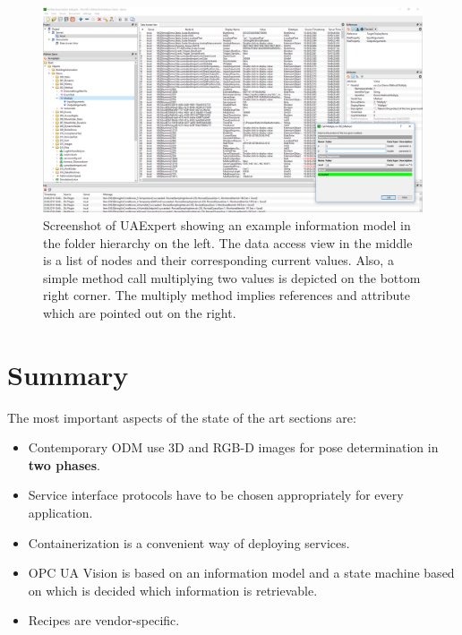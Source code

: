 \begin{landscape}
\begin{figure}[ht]
    \centering
    \includegraphics[width=1.5\textwidth]{img/UAExpertScreenshot.png}
    \caption[Example Information Model in UAExpert]{Screenshot of UAExpert showing an example information model in the folder hierarchy on the left. The data access view in the middle is a list of nodes and their corresponding current values. Also, a simple method call multiplying two values is depicted on the bottom right corner. The multiply method implies references and attribute which are pointed out on the right.}
    \label{fig:uaexpert}
\end{figure}
\end{landscape}

\section{Summary}
The most important aspects of the state of the art sections are:
\begin{itemize}
    \item Contemporary ODM use 3D and RGB-D images for pose determination in \textbf{two phases}.
    \item Service interface protocols have to be chosen appropriately for every application.
    \item Containerization is a convenient way of deploying services.
    \item OPC UA Vision is based on an information model and a state machine based on which is decided which information is retrievable.
    \item Recipes are vendor-specific.
\end{itemize}
